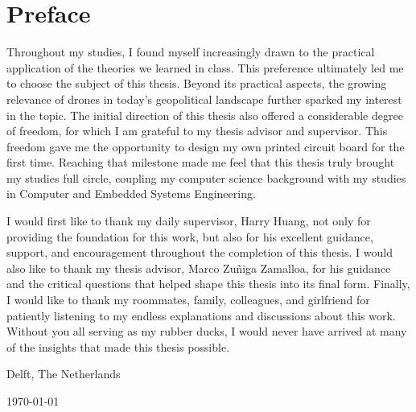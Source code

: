 \chapter*{Preface}

Throughout my studies, I found myself increasingly drawn to the practical application of the theories we learned in class. This preference ultimately led me to choose the subject of this thesis. Beyond its practical aspects, the growing relevance of drones in today's geopolitical landscape further sparked my interest in the topic. The initial direction of this thesis also offered a considerable degree of freedom, for which I am grateful to my thesis advisor and supervisor. This freedom gave me the opportunity to design my own printed circuit board for the first time. Reaching that milestone made me feel that this thesis truly brought my studies full circle, coupling my computer science background with my studies in Computer and Embedded Systems Engineering.


\vspace{1\baselineskip}

I would first like to thank my daily supervisor, Harry Huang, not only for providing the foundation for this work, but also for his excellent guidance, support, and encouragement throughout the completion of this thesis. I would also like to thank my thesis advisor, Marco Zuñiga Zamalloa, for his guidance and the critical questions that helped shape this thesis into its final form. Finally, I would like to thank my roommates, family, colleagues, and girlfriend for patiently listening to my endless explanations and discussions about this work. Without you all serving as my rubber ducks, I would never have arrived at many of the insights that made this thesis possible.

\vspace{1\baselineskip}

\reportAuthor

\vspace{1\baselineskip}

\noindent
Delft, The Netherlands

\noindent
\today